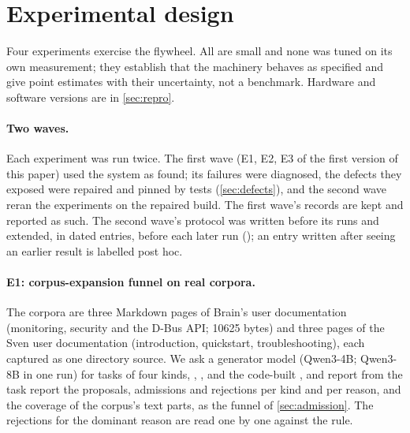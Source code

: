 
\section{Experimental design}\label{sec:design}

Four experiments exercise the flywheel. All are small and none was tuned on its own measurement; they establish that the machinery behaves as
specified and give point estimates with their uncertainty, not a benchmark. Hardware
and software versions are in \cref{sec:repro}.

\paragraph{Two waves.} Each experiment was run twice. The first wave (E1, E2, E3 of the first
version of this paper) used the system as found; its failures were diagnosed, the defects they
exposed were repaired and pinned by tests (\cref{sec:defects}), and the second wave reran the
experiments on the repaired build. The first wave's records are kept and reported as such. The
second wave's protocol was written before its runs and extended, in dated entries, before each
later run (); an entry written after seeing an earlier result is
labelled post hoc.

\paragraph{E1: corpus-expansion funnel on real corpora.} The corpora are three Markdown pages
of Brain's user documentation (monitoring, security and the D-Bus API; 10625 bytes) and three
pages of the Sven user documentation (introduction, quickstart, troubleshooting), each captured as one directory
source. We ask a generator model (Qwen3-4B; Qwen3-8B in one run) for tasks of four kinds,
, ,  and the code-built , and report
from the task report the proposals, admissions and rejections per kind and per reason, and the
coverage of the corpus's text parts, as the funnel of \cref{sec:admission}. The rejections for
the dominant reason are read one by one against the rule.

